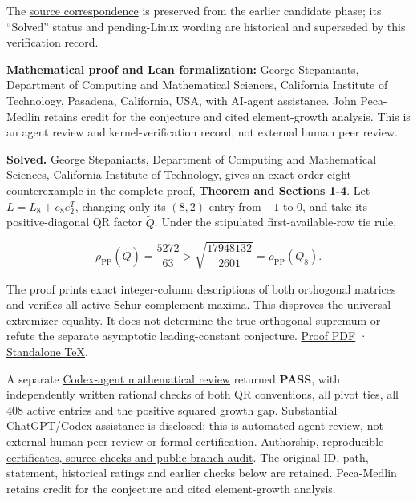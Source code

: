 \documentclass[11pt,a4paper]{article}
\makeatletter
\renewcommand{\subsection}{\Needspace{4\baselineskip}\@startsection{subsection}{2}{0pt}{9pt plus 1pt minus 1pt}{3pt}{\sffamily\bfseries\normalsize\color{ink}}}
\makeatother
\begin{document}
The
\href{https://github.com/ajt60gaibb/OpenProblemsInNLA/blob/main/linear-systems-and-elimination/IE-05/lean/SourceCorrespondence.md}{source
correspondence} is preserved from the earlier candidate phase; its
``Solved'' status and pending-Linux wording are historical and
superseded by this verification record.

\textbf{Mathematical proof and Lean formalization:} George Stepaniants,
Department of Computing and Mathematical Sciences, California Institute
of Technology, Pasadena, California, USA, with AI-agent assistance. John
Peca-Medlin retains credit for the conjecture and cited element-growth
analysis. This is an agent review and kernel-verification record, not
external human peer review.

\subsection{Negative resolution -
2026-09-11}\label{negative-resolution---2026-09-11}

\textbf{Solved.} George Stepaniants, Department of Computing and
Mathematical Sciences, California Institute of Technology, gives an
exact order-eight counterexample in the
\href{https://github.com/ajt60gaibb/OpenProblemsInNLA/blob/main/linear-systems-and-elimination/IE-05/solution.md}{complete
proof}, \textbf{Theorem and Sections 1-4}. Let
\(\widetilde L=L_8+e_8e_2^T\), changing only its \((8,2)\) entry from
\(-1\) to \(0\), and take its positive-diagonal QR factor
\(\widetilde Q\). Under the stipulated first-available-row tie rule,

\[\rho_{\mathrm{PP}}(\widetilde Q)=\frac{5272}{63}
>\sqrt{\frac{17948132}{2601}}
=\rho_{\mathrm{PP}}(Q_8).\]

The proof prints exact integer-column descriptions of both orthogonal
matrices and verifies all active Schur-complement maxima. This disproves
the universal extremizer equality. It does not determine the true
orthogonal supremum or refute the separate asymptotic leading-constant
conjecture.
\href{https://github.com/ajt60gaibb/OpenProblemsInNLA/blob/main/linear-systems-and-elimination/IE-05/solution.pdf}{Proof
PDF} ·
\href{https://github.com/ajt60gaibb/OpenProblemsInNLA/blob/main/linear-systems-and-elimination/IE-05/solution.tex}{Standalone
TeX}.

A separate
\href{https://github.com/ajt60gaibb/OpenProblemsInNLA/blob/main/references/stepaniants-ie05-2026-09-11/independent-review.md}{Codex-agent
mathematical review} returned \textbf{PASS}, with independently written
rational checks of both QR conventions, all pivot ties, all 408 active
entries and the positive squared growth gap. Substantial ChatGPT/Codex
assistance is disclosed; this is automated-agent review, not external
human peer review or formal certification.
\href{https://github.com/ajt60gaibb/OpenProblemsInNLA/blob/main/references/stepaniants-ie05-2026-09-11/README.md}{Authorship,
reproducible certificates, source checks and public-branch audit}. The
original ID, path, statement, historical ratings and earlier checks
below are retained. Peca-Medlin retains credit for the conjecture and
cited element-growth analysis.
\end{document}
